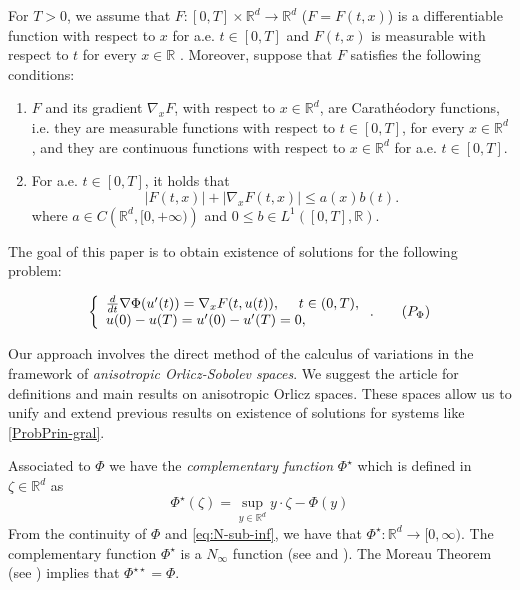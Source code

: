 \documentclass[twoside]{article}
\makeatletter
\theoremstyle{remark}
\newcommand{\labitem}[2]{%
\def\@itemlabel{#1}
\item
\def\@currentlabel{#1}\label{#2}}
\newcommand{\rr}{\mathbb{R}}
\renewcommand{\leq}{\leqslant}
\makeatother
\begin{document}
For $T>0$, we assume that  $F:[0,T]\times\rr^d\to\rr^d$  ($F=F(t,x)$)
  is a differentiable function  with respect to $x$ for a.e. $t\in [0,T]$ and $F(t,x)$ is measurable  with respect to $t$ for every $x\in\rr$ . Moreover, suppose that $F$ satisfies the following conditions:
\begin{enumerate}
\labitem{(C)}{item:condicion_c} $F$ and its gradient $\nabla_x F$, with respect to $x\in\rr^d$,  are  Carath\'eodory functions, i.e. they are measurable functions with respect to $t\in [0,T]$, for every  $x\in\rr^d$, and they are continuous functions with  respect to  $x\in\rr^d$ for a.e. $t \in [0,T]$.
 \labitem{(A)}{item:condicion_a}  For   a.e. $t\in [0,T]$, it holds that
\begin{equation}\label{eq:phi-lagrange}
|F(t,x)| + |\nabla_x F(t,x)|  \leq a(x)b(t).
\end{equation}
where  $a\in C\left(\rr^d,[0,+\infty)\right)$ and $0\leq b\in L^1([0,T],\rr)$.
\end{enumerate}


The goal of this paper is to obtain existence of solutions for  the following problem:

\begin{equation}\label{eq:ProbPhiLapla}
    \left\{%
\begin{array}{ll}
  \frac{d}{dt} \nabla \Phi(u'(t))= \nabla_{x}F(t,u(t)), \quad \ t \in (0,T),\\
    u(0)-u(T)=u'(0)-u'(T)=0,
\end{array}%
\right. .\tag{${P_{\Phi}}$}
\end{equation}






Our approach involves the direct method of the calculus of variations in the framework of \emph{anisotropic Orlicz-Sobolev spaces}.  We suggest the article  \cite{Orliczvectorial2005} for definitions and main results on anisotropic Orlicz spaces. These spaces allow us to unify and extend previous results on existence of solutions for systems like \eqref{ProbPrin-gral}.











Associated to $\Phi$ we have the \emph{complementary function} $\Phi^{\star}$ which is defined in $\zeta\in\rr^d$ as
\begin{equation}\label{eq:conjugada}
 \Phi^{\star}(\zeta)=\sup\limits_{y\in\mathbb{R}^d} y\cdot \zeta-\Phi(y)
\end{equation}
From the continuity of $\Phi$ and  \eqref{eq:N-sub-inf}, we have that $\Phi^{\star}:\rr^d \to [0,\infty)$. 
The complementary function $\Phi^{\star}$ is a  $N_{\infty}$ function (see \cite[Chapter 2]{mawhin2010critical} and \cite[Th. 2.2]{Orliczvectorial2005}).  The Moreau Theorem (see \cite[Th. 4.21]{clarke2013functional}) implies that $\Phi^{\star\star}=\Phi$.
\end{document}
